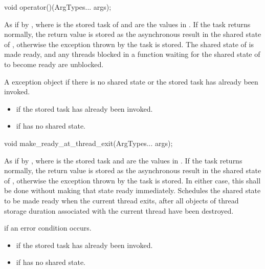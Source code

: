 %
\begin{itemdecl}
void operator()(ArgTypes... args);
\end{itemdecl}

\begin{itemdescr}
\pnum
\effects
As if by ,
where  is the
stored task of  and
 are the values in . If the task returns normally,
the return value is stored as the asynchronous result in the shared state of
, otherwise the exception thrown by the task is stored. The
shared state of  is made ready, and any threads blocked in a
function waiting for
the shared state of  to become ready are unblocked.

\pnum
\throws
A  exception object if there is no shared
state or the stored task has already been invoked.

\pnum
\errors
\begin{itemize}
\item {} if
the stored task has already been invoked.
\item {} if  has no shared state.
\end{itemize}
\end{itemdescr}

%
\begin{itemdecl}
void make_ready_at_thread_exit(ArgTypes... args);
\end{itemdecl}

\begin{itemdescr}
\pnum
\effects
As if by ,
where  is the stored task and
 are the values in . If the task returns normally,
the return value is stored as the asynchronous result in the shared state of
, otherwise the exception thrown by the task is stored. In either
case, this shall be done without making that state ready immediately. Schedules
the shared state to be made ready when the current thread exits,
after all objects of thread storage duration associated with the current thread
have been destroyed.

\pnum
\throws
{} if an error condition occurs.

\pnum
\errors
\begin{itemize}
\item {} if the
stored task has already been invoked.
\item {} if  has no shared state.
\end{itemize}
\end{itemdescr}


